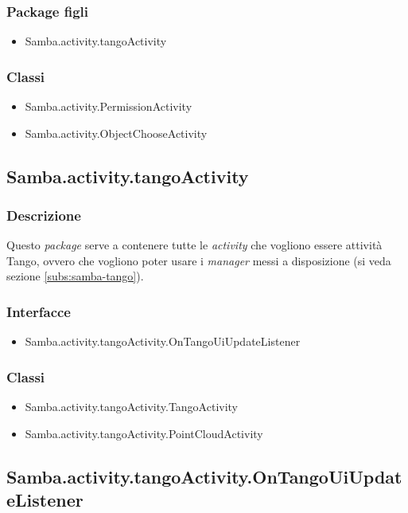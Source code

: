 \subsubsection{Package figli}
\begin{itemize}
	\item Samba.activity.tangoActivity
\end{itemize}
\subsubsection{Classi}
\begin{itemize}
	\item Samba.activity.PermissionActivity
	\item Samba.activity.ObjectChooseActivity
\end{itemize}

\subsection{Samba.activity.tangoActivity}
\subsubsection{Descrizione}
Questo \emph{package} serve a contenere tutte le \emph{activity} che vogliono essere attività Tango, ovvero che vogliono poter usare i \emph{manager} messi a disposizione (si veda sezione \ref{subs:samba-tango}).
\subsubsection{Interfacce}
\begin{itemize}
	\item Samba.activity.tangoActivity.OnTangoUiUpdateListener
\end{itemize}
\subsubsection{Classi}
\begin{itemize}
	\item Samba.activity.tangoActivity.TangoActivity
	\item Samba.activity.tangoActivity.PointCloudActivity
\end{itemize}

\subsection{Samba.activity.tangoActivity.OnTangoUiUpdateListener}
